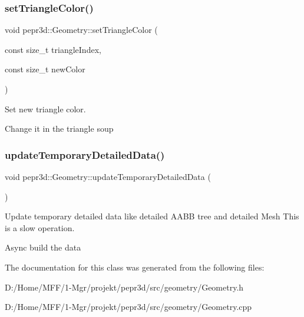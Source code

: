 \subsubsection{\texorpdfstring{setTriangleColor()}{setTriangleColor()}}
{\footnotesize\ttfamily void pepr3d\+::\+Geometry\+::set\+Triangle\+Color (\begin{DoxyParamCaption}\item[{const size\+\_\+t}]{triangle\+Index,  }\item[{const size\+\_\+t}]{new\+Color }\end{DoxyParamCaption})}



Set new triangle color. 

Change it in the triangle soup \mbox{\label{classpepr3d_1_1_geometry_ad25fda5afe4c73c0fd9dbd4bf77952b1}} 
\subsubsection{\texorpdfstring{updateTemporaryDetailedData()}{updateTemporaryDetailedData()}}
{\footnotesize\ttfamily void pepr3d\+::\+Geometry\+::update\+Temporary\+Detailed\+Data (\begin{DoxyParamCaption}{ }\end{DoxyParamCaption})}



Update temporary detailed data like detailed A\+A\+BB tree and detailed Mesh This is a slow operation. 

Async build the data 

The documentation for this class was generated from the following files\+:\begin{DoxyCompactItemize}
\item 
D\+:/\+Home/\+M\+F\+F/1-\/\+Mgr/projekt/pepr3d/src/geometry/Geometry.\+h\item 
D\+:/\+Home/\+M\+F\+F/1-\/\+Mgr/projekt/pepr3d/src/geometry/Geometry.\+cpp\end{DoxyCompactItemize}
